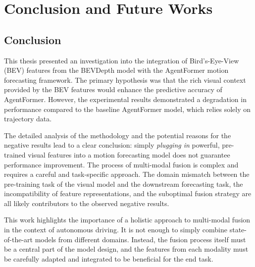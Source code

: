 
\chapter{Conclusion and Future Works} %

\label{Chapter5} %


\section{Conclusion}

This thesis presented an investigation into the integration of Bird's-Eye-View (BEV) features from the BEVDepth model with the AgentFormer motion forecasting framework. The primary hypothesis was that the rich visual context provided by the BEV features would enhance the predictive accuracy of AgentFormer. However, the experimental results demonstrated a degradation in performance compared to the baseline AgentFormer model, which relies solely on trajectory data.

The detailed analysis of the methodology and the potential reasons for the negative results lead to a clear conclusion: simply \textit{plugging in} powerful, pre-trained visual features into a motion forecasting model does not guarantee performance improvement. The process of multi-modal fusion is complex and requires a careful and task-specific approach. The domain mismatch between the pre-training task of the visual model and the downstream forecasting task, the incompatibility of feature representations, and the suboptimal fusion strategy are all likely contributors to the observed negative results.

This work highlights the importance of a holistic approach to multi-modal fusion in the context of autonomous driving. It is not enough to simply combine state-of-the-art models from different domains. Instead, the fusion process itself must be a central part of the model design, and the features from each modality must be carefully adapted and integrated to be beneficial for the end task.


